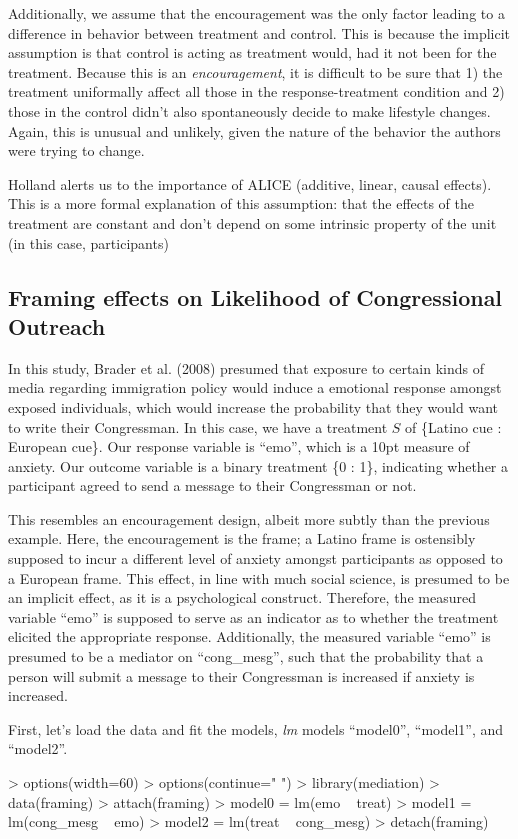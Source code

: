 \documentclass{article}
\begin{document}
Additionally, we assume that the encouragement was the only factor leading to a difference in behavior between treatment and control.  This is because the implicit assumption is that control is acting as treatment would, had it not been for the treatment.  Because this is an \emph{encouragement}, it is difficult to be sure that 1) the treatment uniformally affect all those in the response-treatment condition and 2) those in the control didn't also spontaneously decide to make lifestyle changes.  Again, this is unusual and unlikely, given the nature of the behavior the authors were trying to change.

Holland alerts us to the importance of ALICE (additive, linear, causal effects).  This is a more formal explanation of this assumption: that the effects of the treatment are constant and don't depend on some intrinsic property of the unit (in this case, participants)

\subsection{Framing effects on Likelihood of Congressional Outreach}
In this study, Brader et al. (2008) presumed that exposure to certain kinds of media regarding immigration policy would induce a emotional response amongst exposed individuals, which would increase the probability that they would want to write their Congressman.  In this case, we have a treatment $S$ of \{Latino cue : European cue\}.  Our response variable is ``emo'', which is a 10pt measure of anxiety.  Our outcome variable is a binary treatment \{0 : 1\}, indicating whether a participant agreed to send a message to their Congressman or not.  

This resembles an encouragement design, albeit more subtly than the previous example.  Here, the encouragement is the frame; a Latino frame is ostensibly supposed to incur a different level of anxiety amongst participants as opposed to a European frame.  This effect, in line with much social science, is presumed to be an implicit effect, as it is a psychological construct.  Therefore, the measured variable ``emo'' is supposed to serve as an indicator as to whether the treatment elicited the appropriate response.  Additionally, the measured variable ``emo'' is presumed to be a mediator on ``cong\_mesg'', such that the probability that a person will submit a message to their Congressman is increased if anxiety is increased.

First, let's load the data and fit the models, \emph{lm} models ``model0'', ``model1'', and ``model2''.
\begin{Schunk}
\begin{Sinput}
> options(width=60)
> options(continue=" ")
> library(mediation)
> data(framing)
> attach(framing)
> model0 = lm(emo ~ treat)
> model1 = lm(cong_mesg ~ emo)
> model2 = lm(treat ~ cong_mesg)
> detach(framing)
\end{Sinput}
\end{Schunk}
\end{document}
